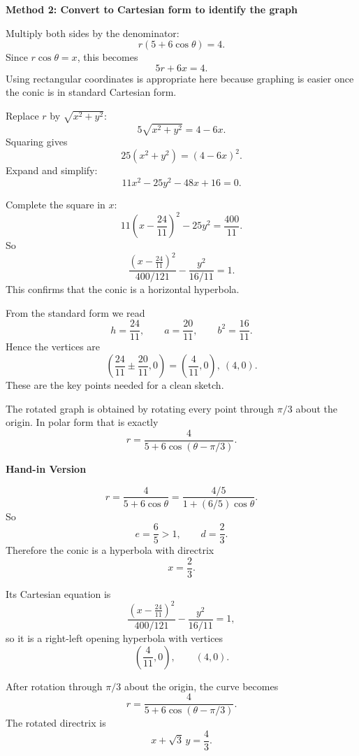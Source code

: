 \documentclass[a4paper,12pt,twocolumn]{article}
\newenvironment{solutionbox}{\begin{framed}}{\end{framed}}
\begin{document}
\begin{solutionbox}
\textbf{Method 2: Convert to Cartesian form to identify the graph}

\begin{steps}
\item Multiply both sides by the denominator:
\[
r(5+6\cos\theta)=4.
\]
Since \(r\cos\theta=x\), this becomes
\[
5r+6x=4.
\]
Using rectangular coordinates is appropriate here because graphing is easier once the conic is in standard Cartesian form.

\item Replace \(r\) by \(\sqrt{x^2+y^2}\):
\[
5\sqrt{x^2+y^2}=4-6x.
\]
Squaring gives
\[
25(x^2+y^2)=(4-6x)^2.
\]
Expand and simplify:
\[
11x^2-25y^2-48x+16=0.
\]

\item Complete the square in \(x\):
\[
11\left(x-\frac{24}{11}\right)^2-25y^2=\frac{400}{11}.
\]
So
\[
\frac{\left(x-\frac{24}{11}\right)^2}{400/121}-\frac{y^2}{16/11}=1.
\]
This confirms that the conic is a horizontal hyperbola.

\item From the standard form we read
\[
h=\frac{24}{11},\qquad a=\frac{20}{11},\qquad b^2=\frac{16}{11}.
\]
Hence the vertices are
\[
\left(\frac{24}{11}\pm\frac{20}{11},0\right)
=\left(\frac{4}{11},0\right),\ (4,0).
\]
These are the key points needed for a clean sketch.

\item The rotated graph is obtained by rotating every point through \(\pi/3\) about the origin. In polar form that is exactly
\[
\boxed{r=\frac{4}{5+6\cos(\theta-\pi/3)}.}
\]
\end{steps}
\end{solutionbox}

\begin{solutionbox}
\textbf{Hand-in Version}

\[
r=\frac{4}{5+6\cos\theta}
=\frac{4/5}{1+(6/5)\cos\theta}.
\]
So
\[
e=\frac65>1,
\qquad
d=\frac23.
\]
Therefore the conic is a hyperbola with directrix
\[
\boxed{x=\frac23.}
\]

Its Cartesian equation is
\[
\boxed{\frac{\left(x-\frac{24}{11}\right)^2}{400/121}-\frac{y^2}{16/11}=1,}
\]
so it is a right-left opening hyperbola with vertices
\[
\left(\frac{4}{11},0\right),\qquad (4,0).
\]

After rotation through \(\pi/3\) about the origin, the curve becomes
\[
\boxed{r=\frac{4}{5+6\cos(\theta-\pi/3)}.}
\]
The rotated directrix is
\[
\boxed{x+\sqrt3\,y=\frac43.}
\]
\end{solutionbox}
\end{document}
